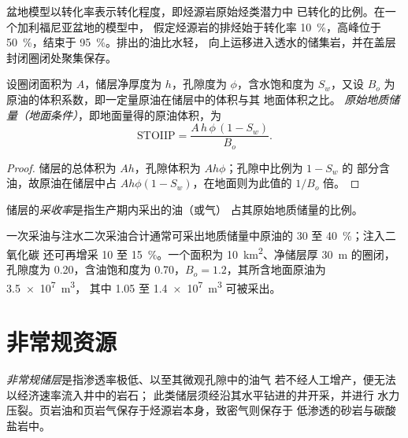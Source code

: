 盆地模型以转化率表示转化程度，即烃源岩原始烃类潜力中
已转化的比例。在一个加利福尼亚盆地的模型中，
假定烃源岩的排烃始于转化率 \qty{10}{\percent}，高峰位于
\qty{50}{\percent}，结束于 \qty{95}{\percent}。排出的油比水轻，
向上运移进入透水的储集岩，并在盖层封闭圈闭处聚集保存。

\begin{proposition}[原地油量]\label{prop:b2:energy-geology:volumetrics}
设圈闭面积为 $A$，储层净厚度为 $h$，孔隙度为 $\phi$，含水饱和度为
$S_w$，又设 $B_o$ 为原油的体积系数，即一定量原油在储层中的体积与其
地面体积之比。
\emph{原始地质储量（地面条件）}，即地面量得的原油体积，为
\begin{equation}
\mathrm{STOIIP} = \frac{A\,h\,\phi\,(1 - S_w)}{B_o} .
\label{eq:b2:energy-geology:stoiip}
\end{equation}
\end{proposition}

\begin{proof}
储层的总体积为 $Ah$，孔隙体积为 $Ah\phi$；孔隙中比例为 $1 - S_w$ 的
部分含油，故原油在储层中占 $Ah\phi(1 - S_w)$，在地面则为此值的
$1/B_o$ 倍。
\end{proof}

\begin{definition}[采收率]\label{def:b2:energy-geology:volumetrics}
储层的\emph{采收率}是指生产期内采出的油（或气）
占其原始地质储量的比例。
\end{definition}

一次采油与注水二次采油合计通常可采出地质储量中原油的 30 至 \qty{40}{\percent}；注入二氧化碳
还可再增采 10 至 \qty{15}{\percent}。一个面积为 \qty{10}{km^2}、净储层厚 \qty{30}{m} 的圈闭，
孔隙度为 0.20，含油饱和度为 0.70，$B_o = 1.2$，其所含地面原油为 \qty{3.5e7}{m^3}，
其中 1.05 至 \qty{1.4e7}{m^3} 可被采出。

\section{非常规资源}\label{sec:b2:energy-geology:unconventional}

\begin{definition}[非常规储层]\label{def:b2:energy-geology:unconventional}
\emph{非常规储层}是指渗透率极低、以至其微观孔隙中的油气
若不经人工增产，便无法以经济速率流入井中的岩石；
此类储层须经沿其水平钻进的井开采，并进行
水力压裂。页岩油和页岩气保存于烃源岩本身，致密气则保存于
低渗透的砂岩与碳酸盐岩中。
\end{definition}

